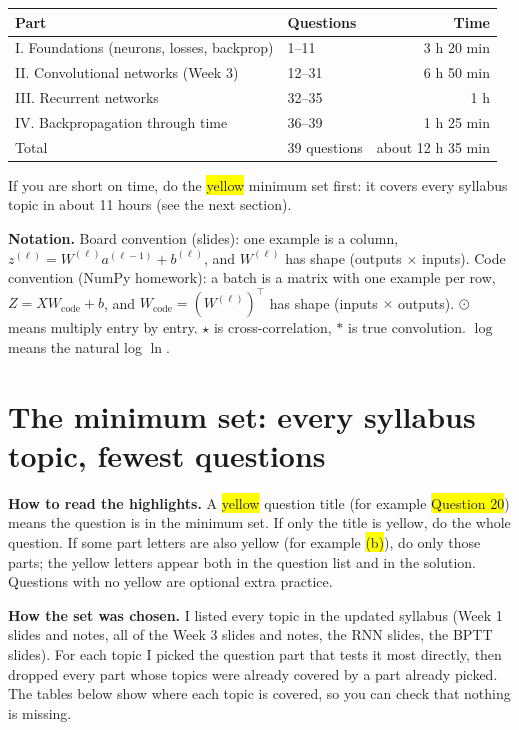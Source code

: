 \documentclass[12pt,a4paper]{article}
\newcommand{\hlq}[1]{{\setlength{\fboxsep}{1.5pt}\colorbox{yellow}{#1}}}
\begin{document}
\begin{center}
\begin{tabular}{@{}llr@{}}
\toprule
Part & Questions & Time \\
\midrule
I. Foundations (neurons, losses, backprop) & 1--11 & 3 h 20 min \\
II. Convolutional networks (Week 3) & 12--31 & 6 h 50 min \\
III. Recurrent networks & 32--35 & 1 h \\
IV. Backpropagation through time & 36--39 & 1 h 25 min \\
\midrule
Total & 39 questions & about 12 h 35 min \\
\bottomrule
\end{tabular}
\end{center}

If you are short on time, do the \hlq{yellow} minimum set first: it covers every syllabus topic in about 11 hours (see the next section).

\textbf{Notation.} Board convention (slides): one example is a column, $z^{(\ell)} = W^{(\ell)} a^{(\ell-1)} + b^{(\ell)}$, and $W^{(\ell)}$ has shape (outputs $\times$ inputs). Code convention (NumPy homework): a batch is a matrix with one example per row, $Z = X W_{\text{code}} + b$, and $W_{\text{code}} = (W^{(\ell)})^\top$ has shape (inputs $\times$ outputs). $\odot$ means multiply entry by entry. $\star$ is cross-correlation, $*$ is true convolution. $\log$ means the natural log $\ln$.

\newpage
\section{The minimum set: every syllabus topic, fewest questions}

\textbf{How to read the highlights.} A \hlq{yellow} question title (for example \hlq{Question 20}) means the question is in the minimum set. If only the title is yellow, do the whole question. If some part letters are also yellow (for example \hlq{(b)}), do only those parts; the yellow letters appear both in the question list and in the solution. Questions with no yellow are optional extra practice.

\textbf{How the set was chosen.} I listed every topic in the updated syllabus (Week 1 slides and notes, all of the Week 3 slides and notes, the RNN slides, the BPTT slides). For each topic I picked the question part that tests it most directly, then dropped every part whose topics were already covered by a part already picked. The tables below show where each topic is covered, so you can check that nothing is missing.
\end{document}
